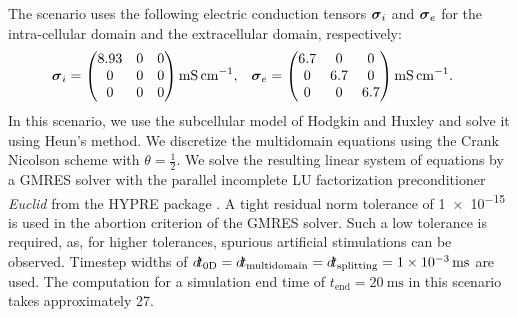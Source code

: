 The scenario uses the following electric conduction tensors $\boldsymbol{\sigma}_i$ and $\boldsymbol{\sigma}_e$ for the intra-cellular domain and the extracellular domain, respectively:
\begin{align}\label{eq:multidomain_isotropic_e}
  \bfsigma_i &= \mat{
  8.93 & 0 & 0\\
  0& 0& 0\\
  0& 0& 0}\SI{}{\milli\siemens\per\centi\meter}, &  \bfsigma_e &= \mat{6.7 & 0 & 0\\
        0& 6.7& 0\\
        0& 0& 6.7}\SI{}{\milli\siemens\per\centi\meter}.
\end{align}
%
In this scenario, we use the subcellular model of Hodgkin and Huxley \cite{Hodgkin1952} and solve it using Heun's method. We discretize the multidomain equations using the Crank Nicolson scheme with $\theta=\frac12$.
We solve the resulting linear system of equations by a GMRES solver with the parallel incomplete LU factorization preconditioner \emph{Euclid} \cite{euclid} from the HYPRE package \cite{falgout2002hypre}. A tight residual norm tolerance of \num{1e-15} is used in the abortion criterion of the GMRES solver. Such a low tolerance is required, as, for higher tolerances, spurious artificial stimulations can be observed. Timestep widths of $\dt_\text{0D}=\dt_\text{multidomain}=\dt_\text{splitting}=\SI{1e-3}{\ms}$ are used. 
The computation for a simulation end time of $t_\text{end}=\SI{20}{\ms}$ in this scenario takes approximately \SI{27}{\min}.


       
